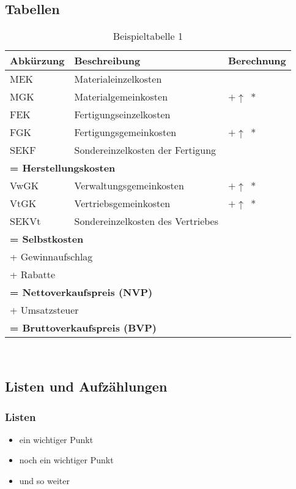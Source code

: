 \subsection{Tabellen} %
\begin{table}[H]
	\centering
	\begin{tabular}[ht]{|l|l|l|}
		\hline
		\textbf{Abkürzung} & \textbf{Beschreibung} & \textbf{Berechnung}\\
		\hline\hline
		MEK & Materialeinzelkosten & \\
		MGK & Materialgemeinkosten & $+ \uparrow$~*\\
		FEK & Fertigungseinzelkosten & \\
		FGK & Fertigungsgemeinkosten & $+ \uparrow$~*\\
		SEKF & Sondereinzelkosten der Fertigung & \\
		\hline\hline
		\multicolumn{3}{|l|}{\textbf{= Herstellungskosten}} \\
		\hline\hline
		VwGK & Verwaltungsgemeinkosten & $+ \uparrow$~*\\
		VtGK & Vertriebsgemeinkosten & $+ \uparrow$~*\\
		SEKVt & Sondereinzelkosten des Vertriebes & \\
		\hline\hline
		\multicolumn{3}{|l|}{\textbf{= Selbstkosten}} \\
		\hline\hline
		\multicolumn{3}{|l|}{+ Gewinnaufschlag} \\
		\multicolumn{3}{|l|}{+ Rabatte} \\
		\hline\hline
		\multicolumn{3}{|l|}{\textbf{= Nettoverkaufspreis (NVP)}} \\
		\hline
		\multicolumn{3}{|l|}{+ Umsatzsteuer} \\
		\hline\hline
		\multicolumn{3}{|l|}{\textbf{= Bruttoverkaufspreis (BVP)}} \\
		\hline
	\end{tabular} \\
	\caption{Beispieltabelle 1}
	\label{tbl:beispieltabelle2}
\end{table}

\subsection{Listen und Aufzählungen}
\subsubsection{Listen}
\begin{itemize}
\item ein wichtiger Punkt
\item noch ein wichtiger Punkt
\item und so weiter
\end{itemize}
